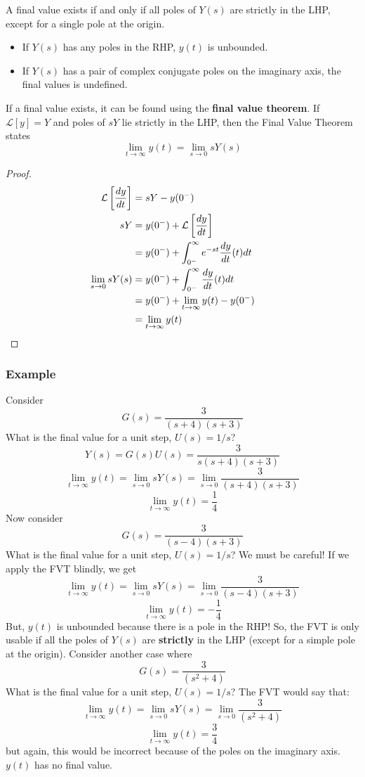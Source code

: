 \documentclass{book}
\newcommand{\LT}{\mathcal{L}}
\newcommand{\exmp}{\subsubsection*{Example}}
\begin{document}
A final value exists if and only if all poles of $ Y(s) $ are strictly in the LHP, except for a single pole at the origin. 
\begin{itemize}
	\item If $ Y(s) $ has any poles in the RHP, $ y(t) $ is unbounded.
	\item If $ Y(s) $  has a pair of complex conjugate poles on the imaginary axis, the final values is undefined.
\end{itemize}
If a final value exists, it can be found using the \textbf{final value theorem}.  If $ \LT[y]=Y $ and poles of $sY $ lie strictly in the LHP, then the Final Value Theorem states
	\[ 	\lim\limits_{t\to\infty}y(t) = \lim\limits_{s\to0}sY(s) \]
\begin{proof}
	\begin{align*}
	\LT\left[\frac{dy}{dt}\right] &= sY-y(0^-)\\
	sY &=y(0^-) + \LT\left[\frac{dy}{dt}\right]\\
	&=y(0^-)+\int_{0^-}^{\infty}e^{-st}\frac{dy}{dt}(t)dt\\
	\lim\limits_{s\to0}sY(s)&= y(0^-) +\int_{0^-}^{\infty}\frac{dy}{dt}(t)dt\\
	&=y(0^-) + \lim_{t\to\infty}y(t) - y(0^-)\\
	&=\lim_{t\to\infty}y(t) && \qedhere
	\end{align*}
\end{proof}

\exmp
Consider
\[ G(s) = \frac{3}{(s+4)(s+3)} \]
What is the final value for a unit step, $ U(s)=1/s $?
\[ Y(s) = G(s)U(s)=\frac{3}{s(s+4)(s+3)} \]
\[ 	\lim_{t\to\infty}y(t)= \lim\limits_{s\to0}sY(s)= \lim\limits_{s\to0} \frac{3}{(s+4)(s+3)} \]
\[ \lim_{t\to\infty}y(t) = \frac{1}{4} \]
Now consider
\[ G(s) = \frac{3}{(s-4)(s+3)} \]
What is the final value for a unit step, $ U(s)=1/s $? We must be careful! If we apply the FVT blindly, we get 
\[ 	\lim_{t\to\infty}y(t)= \lim\limits_{s\to0}sY(s)= \lim\limits_{s\to0} \frac{3}{(s-4)(s+3)} \]
\[ \lim_{t\to\infty}y(t) = -\frac{1}{4} \]
But, $ y(t) $ is unbounded because there is a pole in the RHP! So, the FVT is only usable if all the poles of $ Y(s) $ are \textbf{strictly} in the LHP (except for a simple pole at the origin). Consider another case where
\[ G(s) = \frac{3}{(s^2+4)} \]
What is the final value for a unit step, $ U(s)=1/s $? The FVT would say that:
\[ 	\lim_{t\to\infty}y(t)= \lim\limits_{s\to0}sY(s)= \lim\limits_{s\to0} \frac{3}{(s^2+4)} \]
\[ \lim_{t\to\infty}y(t) = \frac{3}{4} \]
but again, this would be incorrect because of the poles on the imaginary axis. $ y(t) $ has no final value.
\end{document}
